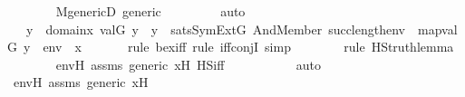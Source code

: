 \begin{isabellebody}
\ \ \ \ \ \ \isamarkupfalse%
\ M{\isacharunderscore}{\kern0pt}genericD\ generic\ \isanewline
\ \ \ \ \ \ \isamarkupfalse%
\ auto\isanewline
\ \ \ \ \isamarkupfalse%
\ \isamarkupfalse%
\ {\isachardoublequoteopen}{\isachardot}{\kern0pt}{\isachardot}{\kern0pt}{\isachardot}{\kern0pt}\ {\isasymlongleftrightarrow}\ {\isacharparenleft}{\kern0pt}{\isasymexists}y{\isacharprime}{\kern0pt}\ {\isasymin}\ domain{\isacharparenleft}{\kern0pt}x{\isacharprime}{\kern0pt}{\isacharparenright}{\kern0pt}{\isachardot}{\kern0pt}\ val{\isacharparenleft}{\kern0pt}G{\isacharcomma}{\kern0pt}\ y{\isacharprime}{\kern0pt}{\isacharparenright}{\kern0pt}\ {\isacharequal}{\kern0pt}\ y\ {\isasymand}\ sats{\isacharparenleft}{\kern0pt}SymExt{\isacharparenleft}{\kern0pt}G{\isacharparenright}{\kern0pt}{\isacharcomma}{\kern0pt}\ And{\isacharparenleft}{\kern0pt}Member{\isacharparenleft}{\kern0pt}{}{\isacharcomma}{\kern0pt}\ succ{\isacharparenleft}{\kern0pt}length{\isacharparenleft}{\kern0pt}env{\isacharprime}{\kern0pt}{\isacharparenright}{\kern0pt}{\isacharparenright}{\kern0pt}{\isacharparenright}{\kern0pt}{\isacharcomma}{\kern0pt}\ {\isasymphi}{\isacharparenright}{\kern0pt}{\isacharcomma}{\kern0pt}\ map{\isacharparenleft}{\kern0pt}val{\isacharparenleft}{\kern0pt}G{\isacharparenright}{\kern0pt}{\isacharcomma}{\kern0pt}\ {\isacharbrackleft}{\kern0pt}y{\isacharprime}{\kern0pt}{\isacharbrackright}{\kern0pt}\ {\isacharat}{\kern0pt}\ env{\isacharprime}{\kern0pt}\ {\isacharat}{\kern0pt}\ {\isacharbrackleft}{\kern0pt}x{\isacharprime}{\kern0pt}{\isacharbrackright}{\kern0pt}{\isacharparenright}{\kern0pt}{\isacharparenright}{\kern0pt}{\isacharparenright}{\kern0pt}{\isachardoublequoteclose}\isanewline
\ \ \ \ \ \ \isamarkupfalse%
{\isacharparenleft}{\kern0pt}rule\ bex{\isacharunderscore}{\kern0pt}iff{\isacharcomma}{\kern0pt}\ rule\ iff{\isacharunderscore}{\kern0pt}conjI{}{\isacharcomma}{\kern0pt}\ simp{\isacharparenright}{\kern0pt}\ \isanewline
\ \ \ \ \ \ \isamarkupfalse%
{\isacharparenleft}{\kern0pt}rule\ HS{\isacharunderscore}{\kern0pt}truth{\isacharunderscore}{\kern0pt}lemma{\isacharparenright}{\kern0pt}\isanewline
\ \ \ \ \ \ \isamarkupfalse%
\ env{\isacharprime}{\kern0pt}H\ assms\ generic\ x{\isacharprime}{\kern0pt}H\ HS{\isacharunderscore}{\kern0pt}iff\isanewline
\ \ \ \ \ \ \ \ \ \isamarkupfalse%
\ auto{\isacharbrackleft}{\kern0pt}{}{\isacharbrackright}{\kern0pt}\ \isanewline
\ \ \ \ \ \ \isamarkupfalse%
\ env{\isacharprime}{\kern0pt}H\ assms\ generic\ x{\isacharprime}{\kern0pt}H\ \isanewline

\end{isabellebody}
